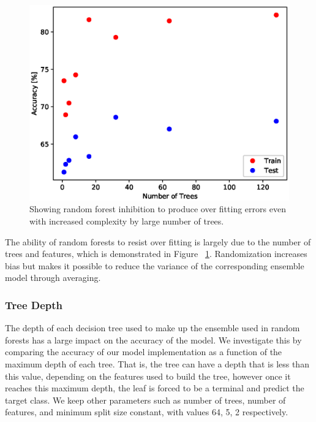 \documentclass{article} %
\begin{document}
\begin{figure}[ht]
\begin{center}
\includegraphics[scale=0.4]{n_trees}
\end{center}
\caption{Showing random forest inhibition to produce over fitting errors even with increased complexity by large number of trees.}
\label{fig:n_trees}
\end{figure}

The ability of random forests to resist over fitting is largely due to the number of trees and features, which is demonstrated in Figure ~\ref{fig:n_trees}. Randomization increases bias but makes it possible to reduce the variance of the corresponding ensemble model through averaging. \cite{formann-roe_2012}

\subsubsection{Tree Depth}

The depth of each decision tree used to make up the ensemble used in random forests has a large impact on the accuracy of the model. We investigate this by comparing the accuracy of our model implementation as a function of the maximum depth of each tree. That is, the tree can have a depth that is less than this value, depending on the features used to build the tree, however once it reaches this maximum depth, the leaf is forced to be a terminal and predict the target class. We keep other parameters such as number of trees, number of features, and minimum split size constant, with values 64, 5, 2 respectively.
\end{document}
